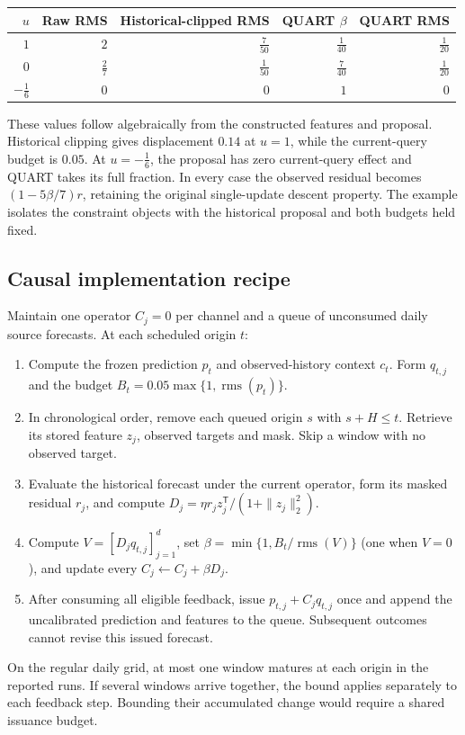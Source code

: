\documentclass[11pt,a4paper]{article}
\newcommand{\rms}{\operatorname{rms}}
\begin{document}
\begin{center}
\small
\begin{tabular}{rrrrr}
\toprule
$u$ & Raw RMS & Historical-clipped RMS & QUART $\beta$ & QUART RMS\\
\midrule
$1$ & $2$ & $\tfrac7{50}$ & $\tfrac1{40}$ & $\tfrac1{20}$\\[3pt]
$0$ & $\tfrac27$ & $\tfrac1{50}$ & $\tfrac7{40}$ & $\tfrac1{20}$\\[3pt]
$-\tfrac16$ & $0$ & $0$ & $1$ & $0$\\
\bottomrule
\end{tabular}
\end{center}

These values follow algebraically from the constructed features and proposal. Historical clipping gives displacement $0.14$ at $u=1$, while the current-query budget is $0.05$. At $u=-\tfrac16$, the proposal has zero current-query effect and QUART takes its full fraction. In every case the observed residual becomes $(1-5\beta/7)r$, retaining the original single-update descent property. The example isolates the constraint objects with the historical proposal and both budgets held fixed.

\subsection{Causal implementation recipe}
Maintain one operator $C_j=0$ per channel and a queue of unconsumed daily source forecasts. At each scheduled origin $t$:
\begin{enumerate}
\item Compute the frozen prediction $p_t$ and observed-history context $c_t$. Form $q_{t,j}$ and the budget $B_t=0.05\max\{1,\rms(p_t)\}$.
\item In chronological order, remove each queued origin $s$ with $s+H\leq t$. Retrieve its stored feature $z_j$, observed targets and mask. Skip a window with no observed target.
\item Evaluate the historical forecast under the current operator, form its masked residual $r_j$, and compute $D_j=\eta r_jz_j^{\mathsf T}/(1+\|z_j\|_2^2)$.
\item Compute $V=[D_jq_{t,j}]_{j=1}^d$, set $\beta=\min\{1,B_t/\rms(V)\}$ (one when $V=0$), and update every $C_j\leftarrow C_j+\beta D_j$.
\item After consuming all eligible feedback, issue $p_{t,j}+C_jq_{t,j}$ once and append the uncalibrated prediction and features to the queue. Subsequent outcomes cannot revise this issued forecast.
\end{enumerate}
On the regular daily grid, at most one window matures at each origin in the reported runs. If several windows arrive together, the bound applies separately to each feedback step. Bounding their accumulated change would require a shared issuance budget.
\end{document}

